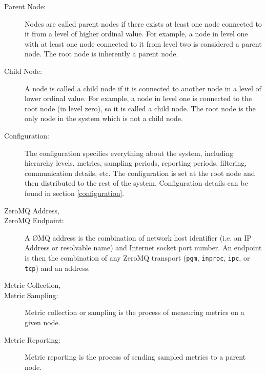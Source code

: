 \begin{description}
\item[Parent Node:]
Nodes are called parent nodes if there exists at least one node connected to it from a level of higher ordinal value.
For example, a node in level one with at least one node connected to it from level two is considered a parent node. The
root node is inherently a parent node. 

\item[Child Node:]
A node is called a child node if it is connected to another node in a level of lower ordinal value. For example, a node
in level one is connected to the root node (in level zero), so it is called a child node. The root node is the only
node in the \dcamp system which is not a child node. 

\item[\dcamp Configuration:]
The \dcamp configuration specifies everything about the system, including hierarchy levels, metrics, sampling periods,
reporting periods, filtering, communication details, etc. The configuration is set at the root node and then
distributed to the rest of the \dcamp system. Configuration details can be found in section \ref{configuration}. 

\item[ZeroMQ Address,]
\item[ZeroMQ Endpoint:]
A \O MQ address is the combination of network host identifier (i.e. an IP Address or resolvable name) and Internet
socket port number. An endpoint is then the combination of any ZeroMQ transport (\texttt{pgm}, \texttt{inproc},
\texttt{ipc}, or \texttt{tcp}) and an address.

\item[Metric Collection,]
\item[Metric Sampling:]
Metric collection or sampling is the process of measuring metrics on a given node. 

\item[Metric Reporting:]
Metric reporting is the process of sending sampled metrics to a parent node.

\end{description}

